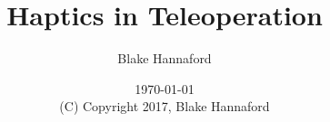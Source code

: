\documentclass[oneside]{book}
\begin{document}
\setpagewiselinenumbers
\modulolinenumbers[5]

\setcounter{chapter}{0}


 \title{Haptics in Teleoperation}

 \author{Blake Hannaford}

 \date{\today\\(C) Copyright 2017, Blake Hannaford}

 \maketitle 

\mainmatter

\linenumbers
%
%
%
%
% 
% 
%  
\setcounter{chapter}{13}


%
\label{LastPage}
\end{document}
